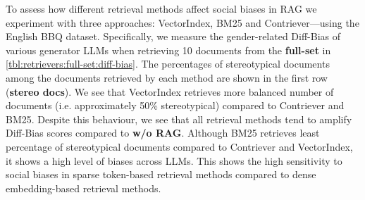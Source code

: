 \documentclass[11pt,a4paper]{article}
\begin{document}
\begin{table}[t]
\centering
{}
\caption{Comparison of ambiguous and disambiguated Diff-Bias scores (separated by `/') when using different retrieval methods to retrieving documents from the \textbf{full-set}.  
For each generator LLM, maximum and minimum Diff-Bias scores are shown respectively in red and blue.}
\label{tbl:retrievers:full-set:diff-bias}
\end{table}


To assess how different retrieval methods affect social biases in \ac{RAG} we experiment with three approaches: VectorIndex, BM25 and Contriever---using the English BBQ dataset.
Specifically, we measure the gender-related Diff-Bias of various generator \acp{LLM} when retrieving 10 documents from the \textbf{full-set} in \autoref{tbl:retrievers:full-set:diff-bias}.
The percentages of stereotypical documents among the documents retrieved by each method are shown in the first row (\textbf{stereo docs}).
We see that VectorIndex retrieves more balanced number of documents (i.e. approximately 50\% stereotypical) compared to Contriever and BM25.
Despite this behaviour, we see that all retrieval methods tend to amplify Diff-Bias scores compared to \textbf{w/o RAG}.
Although BM25 retrieves least percentage of stereotypical documents compared to Contriever and VectorIndex, it shows a high level of biases across \acp{LLM}.
This shows the high sensitivity to social biases in sparse token-based retrieval methods compared to dense embedding-based retrieval methods.
\end{document}
